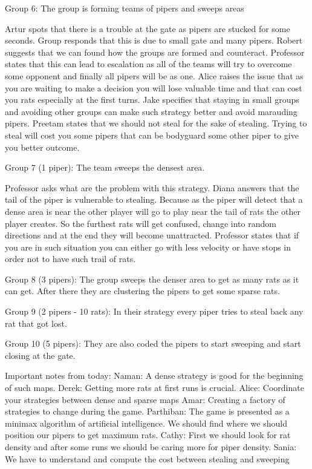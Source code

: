 Group 6:
The group is forming teams of pipers and sweeps areas

Artur spots that there is a trouble at the gate as pipers are stucked for some seconds. 
Group responds that this is due to small gate and many pipers.
Robert suggests that we can found how the groups are formed and counteract.
Professor states that this can lead to escalation as all of the teams will try to overcome some opponent and finally all pipers will be as one.
Alice raises the issue that as you are waiting to make a decision you will lose valuable time and that can cost you rats especially at the first turns.
Jake specifies that staying in small groups and avoiding other groups can make such strategy better and avoid marauding pipers.
Preetam states that we should not steal for the sake of stealing. Trying to steal will cost you some pipers that can be bodyguard some other piper to give you better outcome.

Group 7 (1 piper):
The team sweeps the densest area.

Professor asks what are the problem with this strategy.
Diana answers that the tail of the piper is vulnerable 
to stealing. Because as the piper will detect that a 
dense area is near the other player will go to play 
near the tail of rats the other player creates. So the 
furthest rats will get confused, change into random 
directions and at the end they will become unattracted.
Professor states that if you are in such situation you can either go with 
less velocity or have stops in order not to have such trail of rats.

Group 8 (3 pipers):
The group sweeps the denser area to get as many rats as it can get. After there they are clustering the pipers to get some sparse rats.

Group 9 (2 pipers - 10 rats):
In their strategy every piper tries to steal back any rat that got lost.

Group 10 (5 pipers):
They are also coded the pipers to start sweeping and start closing at the gate.

Important notes from today:
Naman: A dense strategy is good for the beginning of such maps.
Derek: Getting more rats at first runs is crucial.
Alice: Coordinate your strategies between dense and sparse maps
Amar: Creating a factory of strategies to change during the game.
Parthiban: The game is presented as a minimax algorithm of artificial intelligence. We should find where we should position our pipers to get maximum rats. 
Cathy: First we should look for rat density and after some runs we should be caring more for piper density.
Sania: We have to understand and compute the cost between stealing and sweeping


